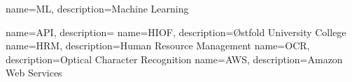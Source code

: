 \RequirePackage{glossaries}
\makeglossaries


{
    name=ML,
    description={Machine Learning}
}

{
    name=API,
    description={}
}
{
    name=HIOF,
    description={Østfold University College}
}
{
    name=HRM,
    description={Human Resource Management}
}
{
    name=OCR,
    description={Optical Character Recognition}
}
{
    name=AWS,
    description={Amazon Web Services}
}
